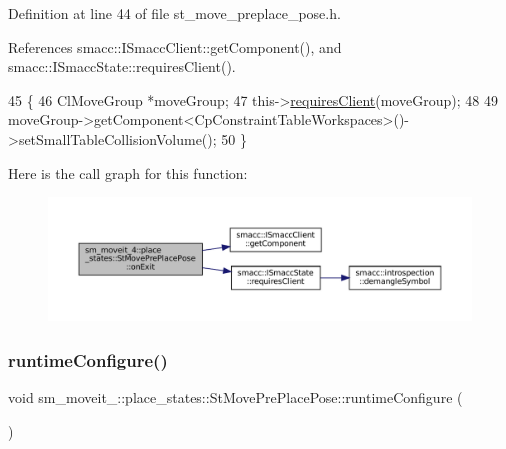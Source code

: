 Definition at line 44 of file st\+\_\+move\+\_\+preplace\+\_\+pose.\+h.



References smacc\+::\+I\+Smacc\+Client\+::get\+Component(), and smacc\+::\+I\+Smacc\+State\+::requires\+Client().


\begin{DoxyCode}
45             \{
46                 ClMoveGroup *moveGroup;
47                 this->\hyperlink{classsmacc_1_1ISmaccState_a7f95c9f0a6ea2d6f18d1aec0519de4ac}{requiresClient}(moveGroup);
48 
49                 moveGroup->getComponent<CpConstraintTableWorkspaces>()->setSmallTableCollisionVolume();
50             \}
\end{DoxyCode}
Here is the call graph for this function\+:
\nopagebreak
\begin{figure}[H]
\begin{center}
\leavevmode
\includegraphics[width=350pt]{structsm__moveit__4_1_1place__states_1_1StMovePrePlacePose_a4c62c5fdaa740b27f6af5c47d3507dad_cgraph}
\end{center}
\end{figure}
\mbox{\label{structsm__moveit__4_1_1place__states_1_1StMovePrePlacePose_a76aecb88d891dab05216eff868ee4ac7}} 
\subsubsection{\texorpdfstring{runtime\+Configure()}{runtimeConfigure()}}
{\footnotesize\ttfamily void sm\+\_\+moveit\+\_\+::place\+\_\+states\+::\+St\+Move\+Pre\+Place\+Pose\+::runtime\+Configure (\begin{DoxyParamCaption}{ }\end{DoxyParamCaption})\hspace{0.3cm}{\ttfamily [inline]}}



